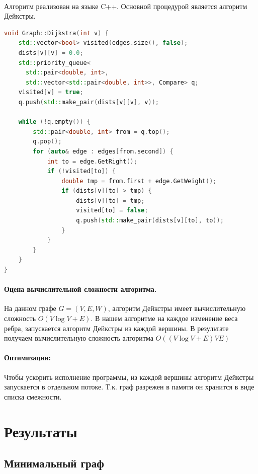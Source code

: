 \documentclass[12pt]{article}
\begin{document}
\paragraph{}
Алгоритм реализован на языке C++. Основной процедурой является
алгоритм Дейкстры\cite{dijkstra}.


\begin{lstlisting}[language=C++]
void Graph::Dijkstra(int v) {
    std::vector<bool> visited(edges.size(), false);
    dists[v][v] = 0.0;
    std::priority_queue<
      std::pair<double, int>,
      std::vector<std::pair<double, int>>, Compare> q;
    visited[v] = true;
    q.push(std::make_pair(dists[v][v], v));

    while (!q.empty()) {
        std::pair<double, int> from = q.top();
        q.pop();
        for (auto& edge : edges[from.second]) {
            int to = edge.GetRight();
            if (!visited[to]) {
                double tmp = from.first + edge.GetWeight();
                if (dists[v][to] > tmp) {
                    dists[v][to] = tmp;
                    visited[to] = false;
                    q.push(std::make_pair(dists[v][to], to));
                }
            }
        }
    }
}
\end{lstlisting}

\paragraph{Оцена вычислительной сложности алгоритма.}

На данном графе $G = (V, E, W)$, алгоритм Дейкстры имеет вычислительную  сложность $O(V \log V + E) $.
В нашем алгоритме на каждое изменение веса ребра, запускается алгоритм Дейкстры из каждой вершины. В результате получаем 
вычислительную сложность алгоритма $O((V \log V + E)VE)$

\paragraph{Оптимизации:}
Чтобы ускорить исполнение программы, из каждой
вершины алгоритм Дейкстры запускается в отдельном
потоке. Т.к. граф разрежен в памяти он хранится в
виде списка смежности.

\section{Результаты}

\subsection{Минимальный граф}
\end{document}
